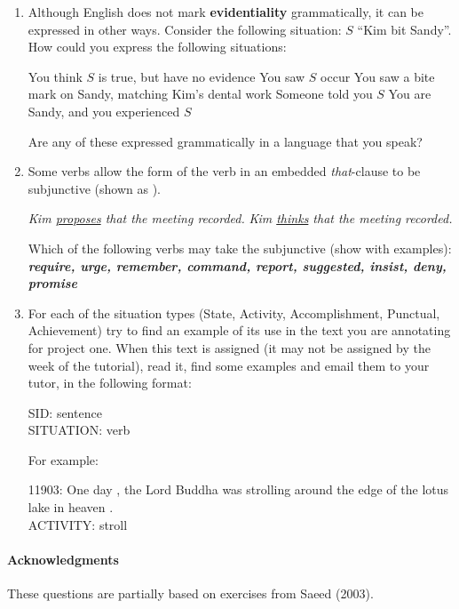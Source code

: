 \documentclass[a4paper]{article}
\newcommand{\lex}[1]{\textbf{\textit{#1}}}
\newcommand{\ix}{\ex\it}
\newcommand{\ul}[1]{\uline{#1}}
\newcommand{\ull}{\uuline}
\begin{document}
\begin{enumerate}
\item Although English does not mark \textbf{evidentiality} grammatically, it
  can be expressed in other ways.  Consider the following situation:
$S$ ``Kim bit Sandy''.  How could you express the following situations:
  \begin{exe}
    \ex You think $S$ is true, but have no evidence
    \ex You saw $S$ occur
    \ex You saw a bite mark on Sandy, matching Kim's dental work
    \ex Someone told you $S$
    \ex You are Sandy, and you experienced $S$ 
  \end{exe}
  Are any of these expressed grammatically in a language that you speak?
\item Some verbs allow the form of the verb in an embedded
  \textit{that}-clause to be subjunctive (shown as \ull{subjunctive form}).
  \begin{exe}
  \ex \textit{Kim \ul{proposes} that the meeting \ull{be} recorded.}
  \ex *\textit{Kim \ul{thinks} that the meeting \ull{be} recorded.}
  \end{exe}
  Which of the following verbs may take the subjunctive (show with
  examples): \\ \lex{require, urge, remember, command, report,
    suggested, insist, deny, promise}

\item For each of the situation types (State, Activity,
  Accomplishment, Punctual, Achievement) try to find an example of its
  use in the text you are annotating for project one.  When this text
  is assigned (it may not be assigned by the week of the tutorial),
  read it, find some examples and email them to your tutor, in the
  following format:
  \begin{flushleft}
    SID: sentence \\
    SITUATION: verb
  \end{flushleft}
   For example:
  \begin{flushleft}
    11903: One day , the Lord Buddha was strolling around the edge of the lotus lake in heaven .\\
    ACTIVITY: stroll
  \end{flushleft}
\end{enumerate}

\vfill
\paragraph{Acknowledgments} These questions are partially
based on exercises from Saeed (2003).
\end{document}
